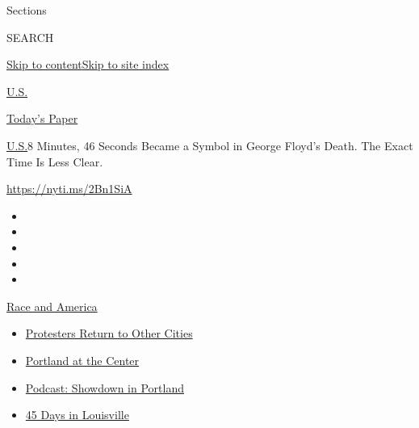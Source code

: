 Sections

SEARCH

\protect\hyperlink{site-content}{Skip to
content}\protect\hyperlink{site-index}{Skip to site index}

\href{https://www.nytimes.com/section/us}{U.S.}

\href{https://myaccount.nytimes.com/auth/login?response_type=cookie\&client_id=vi}{}

\href{https://www.nytimes.com/section/todayspaper}{Today's Paper}

\href{/section/us}{U.S.}\textbar{}8 Minutes, 46 Seconds Became a Symbol
in George Floyd's Death. The Exact Time Is Less Clear.

\url{https://nyti.ms/2Bn1SiA}

\begin{itemize}
\item
\item
\item
\item
\item
\end{itemize}

\href{https://www.nytimes.com/news-event/george-floyd-protests-minneapolis-new-york-los-angeles?action=click\&pgtype=Article\&state=default\&region=TOP_BANNER\&context=storylines_menu}{Race
and America}

\begin{itemize}
\tightlist
\item
  \href{https://www.nytimes.com/2020/07/26/us/protests-portland-seattle-trump.html?action=click\&pgtype=Article\&state=default\&region=TOP_BANNER\&context=storylines_menu}{Protesters
  Return to Other Cities}
\item
  \href{https://www.nytimes.com/2020/07/24/us/portland-oregon-protests-white-race.html?action=click\&pgtype=Article\&state=default\&region=TOP_BANNER\&context=storylines_menu}{Portland
  at the Center}
\item
  \href{https://www.nytimes.com/2020/07/23/podcasts/the-daily/portland-protests.html?action=click\&pgtype=Article\&state=default\&region=TOP_BANNER\&context=storylines_menu}{Podcast:
  Showdown in Portland}
\item
  \href{https://www.nytimes.com/interactive/2020/07/16/us/black-lives-matter-protests-louisville-breonna-taylor.html?action=click\&pgtype=Article\&state=default\&region=TOP_BANNER\&context=storylines_menu}{45
  Days in Louisville}
\end{itemize}

